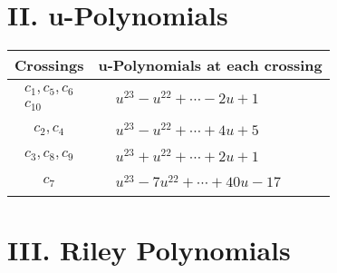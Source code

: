 \documentclass[1p]{elsarticle_modified}
\theoremstyle{definition}
\begin{document}
\newpage\renewcommand{\arraystretch}{1}
\centering \section*{ II. u-Polynomials}
\begin{tabular}{m{50pt}|m{274pt}}
Crossings & \hspace{64pt}u-Polynomials at each crossing \\
\hline $$\begin{aligned}c_{1},c_{5},c_{6}\\c_{10}\end{aligned}$$&$\begin{aligned}
&u^{23}- u^{22}+\cdots-2 u+1
\end{aligned}$\\
\hline $$\begin{aligned}c_{2},c_{4}\end{aligned}$$&$\begin{aligned}
&u^{23}- u^{22}+\cdots+4 u+5
\end{aligned}$\\
\hline $$\begin{aligned}c_{3},c_{8},c_{9}\end{aligned}$$&$\begin{aligned}
&u^{23}+u^{22}+\cdots+2 u+1
\end{aligned}$\\
\hline $$\begin{aligned}c_{7}\end{aligned}$$&$\begin{aligned}
&u^{23}-7 u^{22}+\cdots+40 u-17
\end{aligned}$\\
\hline
\end{tabular}\newpage\renewcommand{\arraystretch}{1}
\centering \section*{ III. Riley Polynomials}
\end{document}
